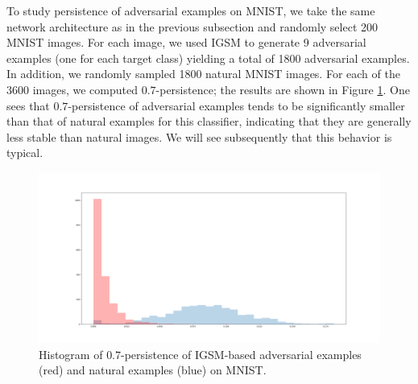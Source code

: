 To study persistence of adversarial examples on MNIST, we take the same network architecture as in the previous subsection and randomly select 200 MNIST images. For each image, we used IGSM to generate 9 adversarial examples (one for each target class) yielding a total of 1800 adversarial examples. In addition, we randomly sampled 1800 natural MNIST images. For each of the 3600 images, we computed $0.7$-persistence; the results are shown in Figure \ref{fig:IGSMpersistenceMNIST}. One sees that $0.7$-persistence of adversarial examples tends to be significantly smaller than that of natural examples for this classifier, indicating that they are generally less stable than natural images. We will see subsequently that this behavior is typical.

\begin{figure}[h!]
\centering
\includegraphics[trim=200 80 100 100, clip,width=.5\textwidth]{c2_figures/original_hist.png}
\caption{Histogram of $0.7$-persistence of IGSM-based adversarial examples (red) and natural examples (blue) on MNIST. %
}
\label{fig:IGSMpersistenceMNIST}
\end{figure}


